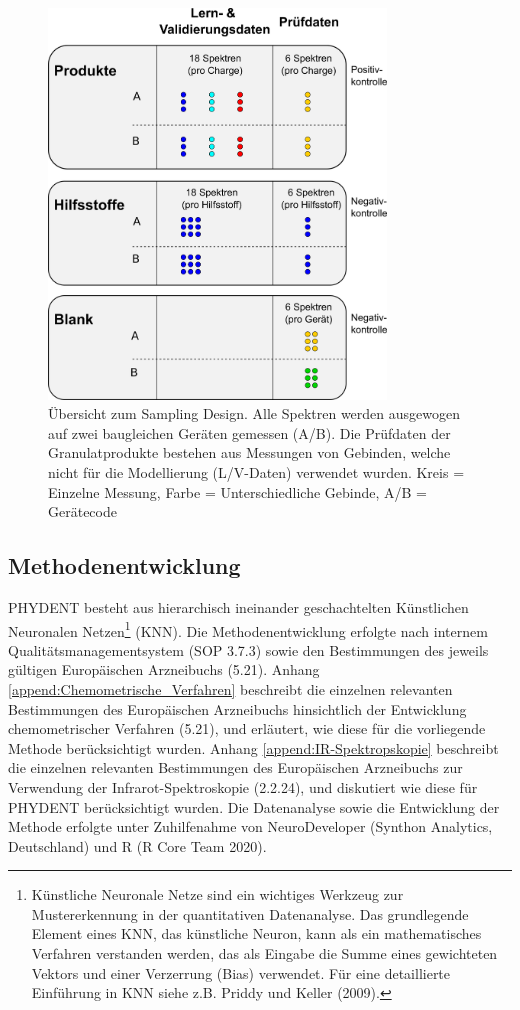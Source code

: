 \documentclass[11pt, a4paper]{article}
\begin{document}
\begin{figure}[h]
\begin{center}
\includegraphics[width=0.8\textwidth]{Figures/sampling_design.png}
\end{center}
\caption{Übersicht zum Sampling Design. Alle Spektren werden ausgewogen auf zwei baugleichen Geräten gemessen (A/B). Die Prüfdaten der Granulatprodukte bestehen aus Messungen von Gebinden, welche nicht für die Modellierung (L/V-Daten) verwendet wurden.
Kreis = Einzelne Messung, Farbe = Unterschiedliche Gebinde, A/B = Gerätecode
}
\label{fig:Sampling_Design}
\end{figure}

\subsection{Methodenentwicklung}
PHYDENT besteht aus hierarchisch ineinander geschachtelten Künstlichen Neuronalen Netzen\footnote{Künstliche Neuronale Netze sind ein wichtiges Werkzeug zur Mustererkennung in der quantitativen Datenanalyse. Das grundlegende Element eines KNN, das künstliche Neuron, kann als ein mathematisches Verfahren verstanden werden, das als Eingabe die Summe eines gewichteten Vektors und einer Verzerrung (Bias) verwendet. Für eine detaillierte Einführung in KNN siehe z.B. Priddy und Keller (2009).} (KNN). Die Methodenentwicklung erfolgte nach internem Qualitätsmanagementsystem (SOP 3.7.3) sowie den Bestimmungen des jeweils gültigen Europäischen Arzneibuchs (5.21). Anhang \ref{append:Chemometrische_Verfahren} beschreibt die einzelnen relevanten Bestimmungen des Europäischen Arzneibuchs hinsichtlich der Entwicklung chemometrischer Verfahren (5.21), und erläutert, wie diese für die vorliegende Methode berücksichtigt wurden. Anhang \ref{append:IR-Spektropskopie} beschreibt die einzelnen relevanten Bestimmungen des Europäischen Arzneibuchs zur Verwendung der Infrarot-Spektroskopie (2.2.24), und diskutiert wie diese für PHYDENT berücksichtigt wurden. Die Datenanalyse sowie die Entwicklung der Methode erfolgte unter Zuhilfenahme von NeuroDeveloper (Synthon Analytics, Deutschland) und R (R Core Team 2020).
\end{document}
